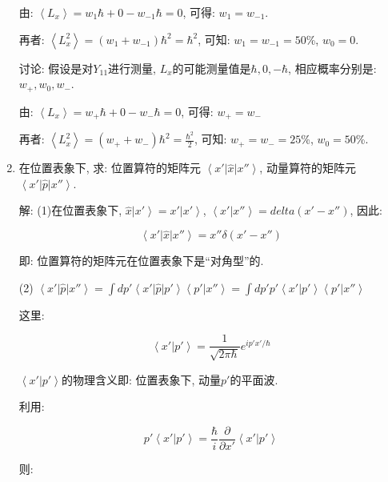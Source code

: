 \begin{enumerate}
由: $\left\langle L_x \right\rangle = w_1 \hbar + 0 - w_{-1}\hbar  =
0$, 可得: $w_{1} = w_{-1}$.

再者: $\left\langle L_x^2 \right\rangle  = (w_1 + w_{-1})\hbar^2 =
\hbar^2$, 可知: $w_1=w_{-1} = 50$\%, $w_0 = 0$.


讨论: 假设是对$Y_{11}$进行测量, $L_x$的可能测量值是$\hbar, 0 ,
-\hbar$, 相应概率分别是: $w_+, w_0, w_-$.

由: $\left\langle L_x \right\rangle = w_+ \hbar + 0 - w_-\hbar  =
0$, 可得: $w_+ = w_-$

再者: $\left\langle L_x^2 \right\rangle  = (w_+ + w_-)\hbar^2 =
\frac{\hbar^2}{2}$, 可知: $w_+=w_- = 25$\%, $w_0 = 50$\%.



\item 在位置表象下, 求: 位置算符的矩阵元 $\left\langle x' \right| \hat x \left| x'' \right\rangle $, 动量算符的矩阵元$\left\langle x' \right| \hat p \left| x'' \right\rangle $.


解: (1)在位置表象下, $\hat x \left| x' \right\rangle = x' \left| x'
\right\rangle$, $\left\langle x' | x'' \right\rangle =
delta(x'-x'')$, 因此:


\begin{equation*}
\left\langle x' \right| \hat x \left| x'' \right\rangle = x''
\delta(x'-x'')
\end{equation*}

即: 位置算符的矩阵元在位置表象下是``对角型''的.

(2) $\left\langle x' \right| \hat p \left| x'' \right\rangle = \int
dp' \left\langle x' \right| \hat p \left| p' \right\rangle
\left\langle p' | x'' \right\rangle = \int dp' p' \left\langle x' |
p' \right\rangle \left\langle p' | x'' \right\rangle $

这里:

\begin{equation*}
\left\langle x' | p' \right\rangle = \frac{1}{\sqrt{2 \pi
\hbar}}e^{ip'x'/\hbar}
\end{equation*}

$\left\langle x' | p' \right\rangle$的物理含义即: 位置表象下,
动量$p'$的平面波.

利用:

\begin{equation*}
p' \left\langle x' | p' \right\rangle =
\frac{\hbar}{i}\frac{\partial }{\partial x'} \left\langle x' | p'
\right\rangle
\end{equation*}

则:


\end{enumerate}
